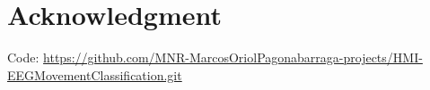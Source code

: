 \documentclass{naturestyle}
\begin{document}

\paperabstract{}

\maketitle






\section*{Acknowledgment}
Code:\linebreak
{\footnotesize \url{https://github.com/MNR-MarcosOriolPagonabarraga-projects/HMI-EEGMovementClassification.git}}



\end{document}
